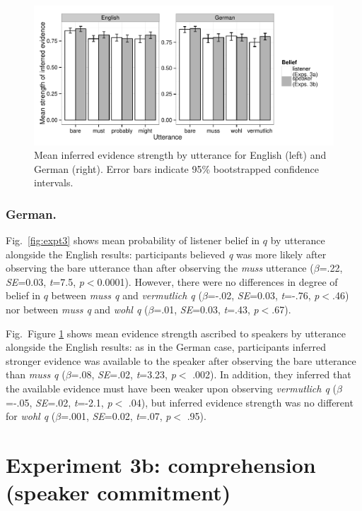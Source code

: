 \documentclass[11pt]{article}
\newcommand{\figref}[1]{Figure \ref{#1}}
\begin{document}
\begin{figure}
	\centering
	\includegraphics[width=\textwidth]{pics/mean-evidence}
	\caption{Mean inferred evidence strength by utterance for English (left) and German (right). Error bars indicate 95\% bootstrapped confidence intervals.}
	\label{fig:exp3-evidence}
\end{figure}

\subsubsection{German.} Fig.~\ref{fig:expt3} shows mean probability of listener belief in $q$ by utterance alongside the English results: participants believed \emph{q} was more likely after observing the bare utterance than after observing the \emph{muss} utterance   ($\beta$=.22, \emph{SE}=0.03, \emph{t}=7.5, \emph{p}$<$0.0001). However, there were no differences in degree of belief in $q$ between \emph{muss q} and \emph{vermutlich q} ($\beta$=-.02, \emph{SE}=0.03, \emph{t}=-.76, \emph{p}$<$.46) nor between \emph{muss q} and \emph{wohl q} ($\beta$=.01, \emph{SE}=0.03, \emph{t}=.43, \emph{p}$<$.67). 

Fig.~\figref{fig:exp3-evidence} shows mean evidence strength ascribed to speakers by utterance alongside the English results: as in the German case, participants inferred stronger evidence was available to the speaker after observing the bare utterance than \emph{muss q} ($\beta$=.08, \emph{SE}=.02, \emph{t}=3.23, \emph{p}$<$ .002). In addition, they inferred that the available evidence must have been weaker upon observing \emph{vermutlich q} ($\beta$=-.05, \emph{SE}=.02, \emph{t}=-2.1, \emph{p}$<$ .04), but inferred evidence strength was no different for \emph{wohl q} ($\beta$=.001, \emph{SE}=0.02, \emph{t}=.07, \emph{p}$<$ .95).

\section{Experiment 3b: comprehension (speaker commitment)}
\end{document}

